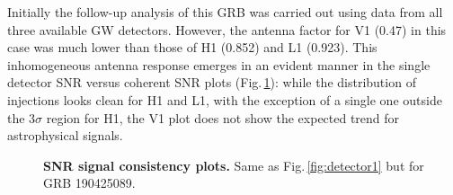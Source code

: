 \documentclass[binding=0.6cm, LaM]{sapthesis}
\begin{document}
	Initially the follow-up analysis of this GRB was carried out using data from all three available GW detectors.
        However, the antenna factor for V1 (0.47) in this case was much lower than those of H1 (0.852) and L1 (0.923).
        This inhomogeneous antenna response emerges in an evident manner in the single detector SNR versus coherent SNR plots (Fig.\,\ref{fig:detector3}):
        while the distribution of injections looks clean for H1 and L1, with the exception of a single one outside the $3 \sigma$ region for H1,
        the V1 plot does not show the expected trend for astrophysical signals.
        \begin{figure}[!t]
          \noindent
          \label{detector3}
          \centering
          \caption{{\bf SNR signal consistency plots.} Same as Fig.\,\ref{fig:detector1} but for GRB 190425089.}
          \label{fig:detector3}
        \end{figure}
\end{document}
